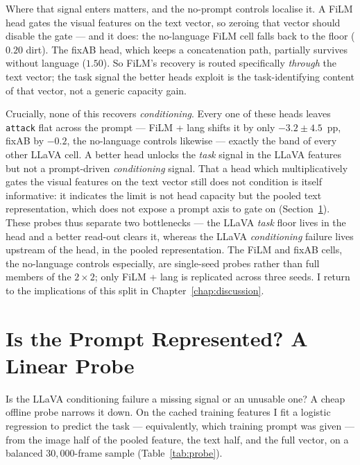 Where that signal enters matters, and the no-prompt controls localise it. A FiLM
head gates the visual features on the text vector, so zeroing that vector should
disable the gate --- and it does: the no-language FiLM cell falls back to the
floor ($0.20$ dirt). The fixAB head, which keeps a concatenation path, partially
survives without language ($1.50$). So FiLM's recovery is routed specifically
\emph{through} the text vector; the task signal the better heads exploit is the
task-identifying content of that vector, not a generic capacity gain.

Crucially, none of this recovers \emph{conditioning}. Every one of these heads
leaves \texttt{attack} flat across the prompt --- FiLM + lang shifts it by only
$-3.2\pm4.5$~pp, fixAB by $-0.2$, the no-language controls likewise --- exactly
the band of every other LLaVA cell. A better head unlocks the \emph{task} signal
in the LLaVA features but not a prompt-driven \emph{conditioning} signal. That a
head which multiplicatively gates the visual features on the text vector still
does not condition is itself informative: it indicates the limit is not head
capacity but the pooled text representation, which does not expose a prompt axis
to gate on (Section~\ref{sec:exp-probe}). These probes thus separate two
bottlenecks --- the LLaVA \emph{task} floor lives in the head and a better
read-out clears it, whereas the LLaVA \emph{conditioning} failure lives upstream
of the head, in the pooled representation. The FiLM and fixAB cells, the
no-language controls especially, are single-seed probes rather than full members
of the $2\times2$; only FiLM + lang is replicated across three seeds. I return to
the implications of this split in Chapter~\ref{chap:discussion}.

\section{Is the Prompt Represented? A Linear Probe}
\label{sec:exp-probe}

Is the LLaVA conditioning failure a missing signal or an unusable one? A cheap
offline probe narrows it down. On the cached training features I fit a logistic
regression to predict the task --- equivalently, which training prompt was given
--- from the image half of the pooled feature, the text half, and the full
vector, on a balanced $30{,}000$-frame sample (Table~\ref{tab:probe}).

